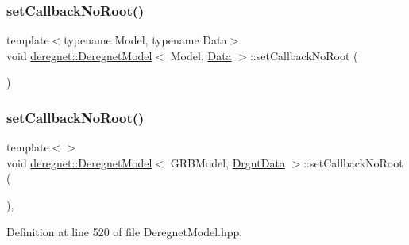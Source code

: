 \subsubsection{\texorpdfstring{set\+Callback\+No\+Root()}{setCallbackNoRoot()}\hspace{0.1cm}{\footnotesize\ttfamily [1/3]}}
{\footnotesize\ttfamily template$<$typename Model, typename Data$>$ \\
void \hyperlink{classderegnet_1_1DeregnetModel}{deregnet\+::\+Deregnet\+Model}$<$ Model, \hyperlink{avgdrgnt_8cpp_a1d1235306db276e9b36acba1db1509e8}{Data} $>$\+::set\+Callback\+No\+Root (\begin{DoxyParamCaption}{ }\end{DoxyParamCaption})\hspace{0.3cm}{\ttfamily [private]}}

\mbox{\label{classderegnet_1_1DeregnetModel_a2aacf97af86f2c0f62b9fe4857443400}} 
\subsubsection{\texorpdfstring{set\+Callback\+No\+Root()}{setCallbackNoRoot()}\hspace{0.1cm}{\footnotesize\ttfamily [2/3]}}
{\footnotesize\ttfamily template$<$$>$ \\
void \hyperlink{classderegnet_1_1DeregnetModel}{deregnet\+::\+Deregnet\+Model}$<$ G\+R\+B\+Model, \hyperlink{classderegnet_1_1DrgntData}{Drgnt\+Data} $>$\+::set\+Callback\+No\+Root (\begin{DoxyParamCaption}{ }\end{DoxyParamCaption})\hspace{0.3cm}{\ttfamily [inline]}, {\ttfamily [private]}}



Definition at line 520 of file Deregnet\+Model.\+hpp.


